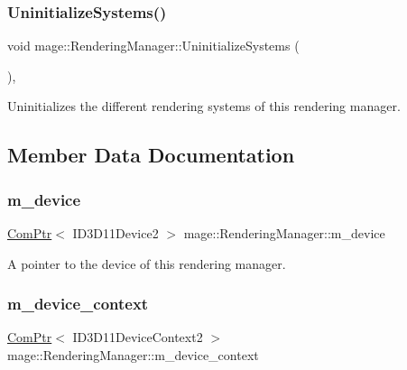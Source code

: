 \subsubsection{\texorpdfstring{Uninitialize\+Systems()}{UninitializeSystems()}}
{\footnotesize\ttfamily void mage\+::\+Rendering\+Manager\+::\+Uninitialize\+Systems (\begin{DoxyParamCaption}{ }\end{DoxyParamCaption})\hspace{0.3cm}{\ttfamily [private]}, {\ttfamily [noexcept]}}

Uninitializes the different rendering systems of this rendering manager. 

\subsection{Member Data Documentation}
\hypertarget{classmage_1_1_rendering_manager_a565560e08553cc8414ec09901273275e}{}\label{classmage_1_1_rendering_manager_a565560e08553cc8414ec09901273275e} 
\subsubsection{\texorpdfstring{m\+\_\+device}{m\_device}}
{\footnotesize\ttfamily \hyperlink{namespacemage_ae74f374780900893caa5555d1031fd79}{Com\+Ptr}$<$ I\+D3\+D11\+Device2 $>$ mage\+::\+Rendering\+Manager\+::m\+\_\+device\hspace{0.3cm}{\ttfamily [private]}}

A pointer to the device of this rendering manager. \hypertarget{classmage_1_1_rendering_manager_aac3b31f3e3ba242d3cd6d7551538021f}{}\label{classmage_1_1_rendering_manager_aac3b31f3e3ba242d3cd6d7551538021f} 
\subsubsection{\texorpdfstring{m\+\_\+device\+\_\+context}{m\_device\_context}}
{\footnotesize\ttfamily \hyperlink{namespacemage_ae74f374780900893caa5555d1031fd79}{Com\+Ptr}$<$ I\+D3\+D11\+Device\+Context2 $>$ mage\+::\+Rendering\+Manager\+::m\+\_\+device\+\_\+context\hspace{0.3cm}{\ttfamily [private]}}


